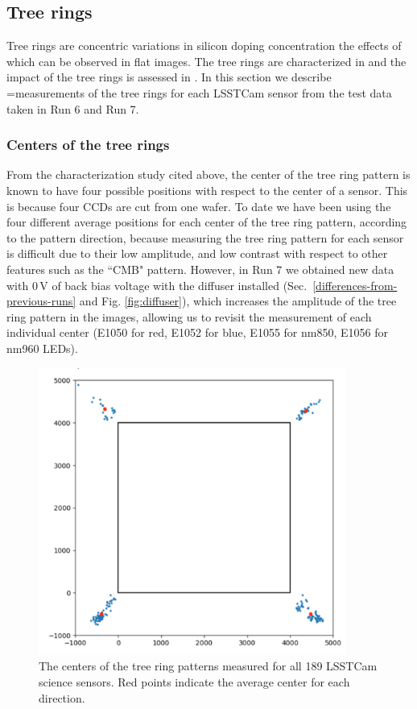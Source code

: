 \subsection{Tree rings}\label{tree-rings}
Tree rings are concentric variations in silicon doping concentration the effects of which can be observed in flat images. The tree rings are characterized in \citet{2017Jinst..12C05015,2020JATIS...6a1005P} and the impact of the tree rings is assessed in \citet{2023PASP..135k5003E}. In this section we describe =measurements of the tree rings for each LSSTCam sensor from the test data taken in Run 6 and Run 7.
\subsubsection{Centers of the tree rings}
From the characterization study cited above, the center of the tree ring pattern is known to have four possible positions with respect to the center of a sensor. This is because four CCDs are cut from one wafer. 
To date we have been using the four different average positions for each center of the tree ring pattern, according to the pattern direction, because measuring the tree ring pattern for each sensor is difficult due to their low amplitude, and low contrast with respect to other features such as the ``CMB" pattern. However, in Run 7 we obtained new data with 0\,V of back bias voltage with the diffuser installed (Sec.~\ref{differences-from-previous-runs} and Fig. \ref{fig:diffuser}), which increases the amplitude of the tree ring pattern in the images, allowing us to revisit the measurement of each individual center (E1050 for red, E1052 for blue, E1055 for nm850, E1056 for nm960 LEDs).

\begin{figure}[ht]
\begin{centering}
\includegraphics[width=0.9\textwidth]{figures/TR_centers.png}
\end{centering}
\caption{The centers of the tree ring patterns measured for all 189 LSSTCam science sensors. Red points indicate the average center for each direction.}
\label{fig:tree_ring_center}
\end{figure}


